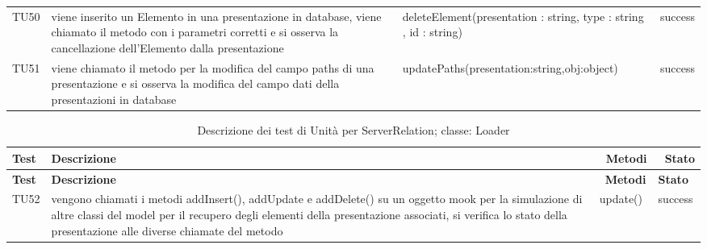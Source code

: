 \begin{longtable} [c]{| p{1cm} | p{6cm} |p{8cm} | p{1.5cm} |}
 		 TU50 & viene inserito un Elemento\ped{g} in una presentazione in database, viene chiamato il metodo con i parametri corretti e si osserva la cancellazione dell'Elemento\ped{g} dalla presentazione & deleteElement(presentation : string, type : string , id : string) & success \\
 		 TU51 & viene chiamato il metodo per la modifica del campo paths di una presentazione e si osserva la modifica del campo dati della presentazioni in database & updatePaths(presentation:string,obj:object) & success \\
 		 \end{longtable}
  \begin{longtable} [c]{| p{1cm} | p{6cm} |p{3cm} | p{1.5cm} |}
		 	 						\caption{Descrizione dei test di Unità per ServerRelation; classe: Loader \label{tab:verTestUnit}}\\
	  		 \hline
	  		 \textbf{Test} & \textbf{Descrizione} & \ \textbf{Metodi} & \ \textbf{Stato} \\
	  		 \hline
	  		 \endfirsthead
	  		 \hline
	  		 \textbf{Test} & \textbf{Descrizione} & \ \textbf{Metodi} & \textbf{Stato} \\
	  		 \hline
		 	 						\endhead
	  		 \hline
	  		 \endfoot
	  		 \hline
	  		 \endlastfoot
 		 TU52 & vengono chiamati i metodi addInsert(), addUpdate e addDelete() su un oggetto mook per la simulazione di altre classi del model per il recupero degli elementi\ped{g} della presentazione associati, si verifica lo stato della presentazione alle diverse chiamate del metodo  & update() & success \\
 		 \end{longtable}
 		 
